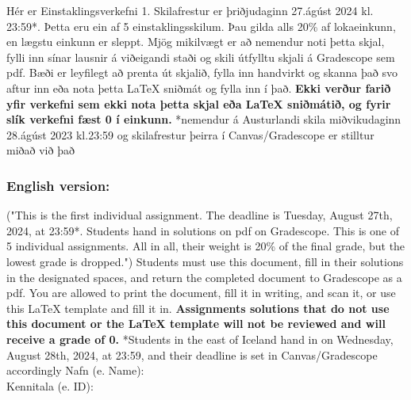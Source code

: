 \noindent
Hér er Einstaklingsverkefni 1. Skilafrestur er þriðjudaginn 27.ágúst 2024 kl. 23:59*. Þetta eru ein af 5 einstaklingsskilum. Þau gilda alls 20\% af lokaeinkunn, en lægstu einkunn er sleppt.
\vspace{2mm}
\newline
Mjög mikilvægt er að nemendur noti þetta skjal, fylli inn sínar lausnir á viðeigandi staði og skili útfylltu skjali á Gradescope sem pdf. Bæði er leyfilegt að prenta út skjalið, fylla inn handvirkt og skanna það svo aftur inn eða nota þetta \LaTeX{} sniðmát og fylla inn í það. \textbf{Ekki verður farið yfir verkefni sem ekki nota þetta skjal eða \LaTeX{} sniðmátið, og fyrir slík verkefni fæst 0 í einkunn.}
\vspace{2mm}
\newline
*nemendur á Austurlandi skila miðvikudaginn 28.ágúst 2023 kl.23:59 og skilafrestur þeirra í Canvas/Gradescope er stilltur miðað við það
\subsubsection*{English version:}
("This is the first individual assignment. The deadline is Tuesday, August 27th, 2024, at 23:59*. Students hand in solutions on pdf on Gradescope. This is one of 5 individual assignments. All in all, their weight is 20\% of the final grade, but the lowest grade is dropped.")
\vspace{2mm}
\newline
Students must use this document, fill in their solutions in the designated spaces, and return the completed document to Gradescope as a pdf. You are allowed to print the document, fill it in writing, and scan it, or use this \LaTeX{} template and fill it in. \textbf{Assignments solutions that do not use this document or the \LaTeX{} template will not be reviewed and will receive a grade of 0.}
\vspace{2mm}
\newline
*Students in the east of Iceland hand in on Wednesday, August 28th, 2024, at 23:59, and their deadline is set in Canvas/Gradescope accordingly
\vspace{2mm}
\newline
Nafn (e. Name): \fillin[12cm] {
} \\ 
Kennitala (e. ID): \fillin[12cm]{
} 